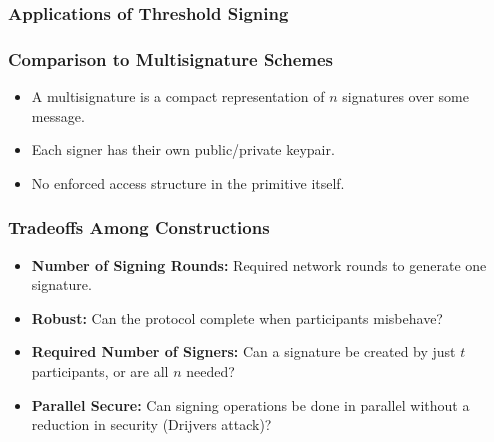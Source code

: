 \documentclass[hyperref={pdfpagelabels=true},table,dvipsnames,14pt,aspectratio=169]{beamer}
\begin{document}
\begin{frame}
  \frametitle{Applications of Threshold Signing}
  \begin{itemize}
  \end{itemize}
\end{frame}

\begin{frame}
  \frametitle{Comparison to Multisignature Schemes}
  \centering

  \begin{itemize}
    \item<1->  A multisignature is a compact representation of $n$ signatures
      over some message.
    \item<2-> Each signer has their own public/private keypair.
    \item<3-> No enforced access structure in the primitive itself.
  \end{itemize}
\end{frame}

\begin{frame}
  \frametitle{Tradeoffs Among Constructions}

  \begin{itemize}
    \item<1-> \textbf{Number of Signing Rounds:} Required network rounds to
      generate one signature.
    \item<2-> \textbf{Robust:} Can the protocol complete when participants
      misbehave?
    \item<3-> \textbf{Required Number of Signers:} Can a signature be
    created by just $t$ participants, or are all $n$ needed?
    \item<4-> \textbf{Parallel Secure:} Can signing operations be done in
      parallel without a reduction in security (Drijvers attack)?
  \end{itemize}
\end{frame}
\end{document}
